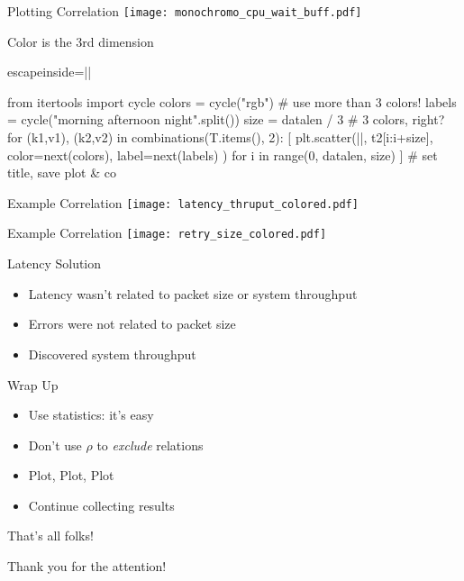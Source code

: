 \documentclass{beamer}[10]
\begin{document}
\begin{pyframe}{Plotting Correlation}
\texttt{[image: monochromo\_cpu\_wait\_buff.pdf]}
\end{pyframe}

\begin{pyframe}{Color is the 3rd dimension}
\begin{pycode*}{escapeinside=||}

from itertools import cycle
colors = cycle("rgb")   # use more than 3 colors!
labels = cycle("morning afternoon night".split())
size = datalen / 3      # 3 colors, right?
for (k1,v1), (k2,v2) in combinations(T.items(), 2):  
  [    plt.scatter(||, t2[i:i+size], 
        color=next(colors), 
        label=next(labels)
        ) for i in range(0, datalen, size) ]
  # set title, save plot & co

   
\end{pycode*}
\end{pyframe}

\begin{pyframe}{Example Correlation}
\texttt{[image: latency\_thruput\_colored.pdf]}
\end{pyframe}

\begin{pyframe}{Example Correlation}
\texttt{[image: retry\_size\_colored.pdf]}
\end{pyframe}

\begin{pyframe}{Latency Solution}
\begin{itemize}
\item Latency wasn't related to packet size or system throughput
\item Errors were not related to packet size
\item Discovered system throughput 
\end{itemize}
\end{pyframe}


\begin{pyframe}{Wrap Up}
\begin{itemize}
\item Use statistics: it's easy
\item Don't use $\rho$ to \emph{exclude} relations
\item Plot, Plot, Plot
\item Continue collecting results
\end{itemize}
\end{pyframe}

\begin{pyframe}{That's all folks!}
\begin{center}
Thank you for the attention! \\\\
\insertauthor
\end{center}
\end{pyframe}
\end{document}
